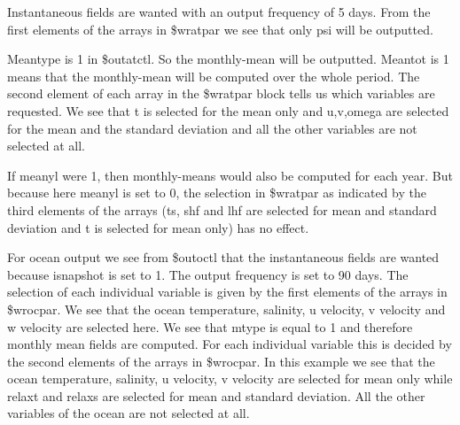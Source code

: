 \newpage
Instantaneous fields are wanted with an output frequency of 5 days. From the first elements of
the arrays in \$wratpar we see that only psi will be outputted.

Meantype is 1 in \$outatctl. So the monthly-mean will be outputted.
Meantot is 1 means that the monthly-mean will be computed over the whole period. The second element of each 
array in the \$wratpar block tells us which variables are requested. We see that
t is selected for the mean only and u,v,omega are selected for the mean and 
the standard deviation and all the other variables are not selected at all.

If meanyl were 1, then monthly-means would also be computed for each year.               
But because here meanyl is set to 0, the selection in \$wratpar as indicated by the third elements
of the arrays (ts, shf and lhf are selected for mean and standard deviation and 
t is selected for mean only) has no effect. 

For ocean output we see from \$outoctl that the instantaneous fields are wanted because isnapshot is set to 
1. The output frequency is set to 90 days. 
The selection of each individual variable is given by the first
elements of the arrays in \$wrocpar. 
We see that the ocean temperature, salinity, u velocity, v velocity and w velocity are selected here.  We see that 
mtype is equal to 1 and therefore monthly mean fields are computed. 
For each individual variable this is decided by the second elements of the arrays in \$wrocpar.
In this example we see that the ocean temperature, salinity, u velocity, v velocity are selected for mean only while 
relaxt and relaxs are selected for mean and standard deviation. All the other variables of the ocean are not selected
at all.
